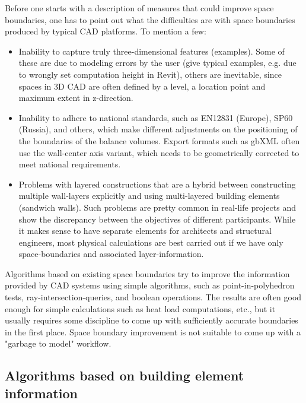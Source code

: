 \documentclass{scrartcl}
\begin{document}
Before one starts with a description of measures that could improve space boundaries, one has to point out what the difficulties are with space boundaries produced by typical CAD platforms. To mention a few:
\begin{itemize}
\item Inability to capture truly three-dimensional features (examples). Some of these are due to modeling errors by the user (give typical examples, e.g. due to wrongly set  computation height in Revit), others are inevitable, since spaces in 3D CAD are often defined by a level, a location point and maximum extent in z-direction.
\item Inability to adhere to national standards, such as EN12831 (Europe), SP60 (Russia), and others, which make different adjustments on the positioning of the boundaries of the balance volumes. Export formats such as gbXML often use the wall-center axis variant, which needs to be geometrically corrected to meet national requirements.
\item Problems with layered constructions that are a hybrid between constructing multiple wall-layers explicitly and using multi-layered building elements (sandwich walls). Such problems are pretty common in real-life projects and show the discrepancy between the objectives of different participants. While it makes sense to have separate elements for architects and structural engineers, most physical calculations are best carried out if we have only space-boundaries and associated layer-information.
\end{itemize}
Algorithms based on existing space boundaries try to improve the information provided by CAD systems using simple algorithms, such as point-in-polyhedron tests, ray-intersection-queries, and boolean operations. The results are often good enough for simple calculations such as heat load computations, etc., but it usually requires some discipline to come up with sufficiently accurate boundaries in the first place. Space boundary improvement is not suitable to come up with a "garbage to model" workflow.

\subsection{Algorithms based on building element information}
\end{document}
